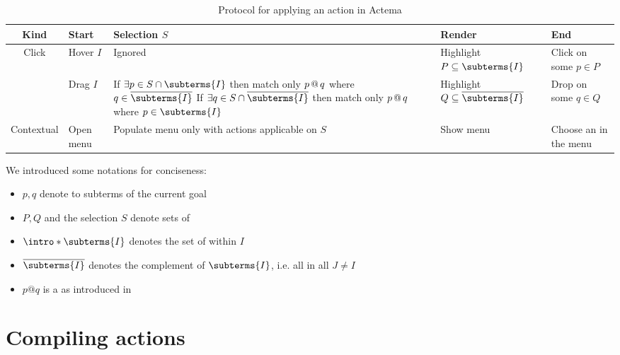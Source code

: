 \begin{table*}[]
  \def\arraystretch{1.5}
  \begin{tabular}{|c|C{0.2\textwidth}|C{0.4\textwidth}|C{0.25\textwidth}|C{0.2\textwidth}|}
  \hline
  \textbf{Kind} & \textbf{Start}       & \textbf{Selection $S$} &
  \textbf{Render}                      & \textbf{End} \\ \hline
  Click         & Hover  $I$       & Ignored & Highlight $P \subseteq
  \subterms{I}$ & Click on some $p \in P$    \\ \hline
             & Drag  $I$        &
      If $\exists p \in S \cap \subterms{I}$ then match only $p \operatorname{\mathrel{@}} q$ where
      $q \in \substermscompl{\subterms{I}}$
      \newline
      If $\exists q \in S \cap \substermscompl{\subterms{I}}$ then match only $p
      \operatorname{\mathrel{@}} q$ where $p \in \subterms{I}$
    & Highlight $Q \subseteq \substermscompl{\subterms{I}}$ & Drop on some $q \in Q$ \\ \hline
  Contextual    & Open menu & Populate menu only with actions
  applicable on $S$ & Show menu & Choose an  in the menu \\ \hline
  \end{tabular}
  \raggedright
  \parbox{\textwidth}{
    \vspace{1.5em}
    We introduced some notations for conciseness:
    \begin{itemize}
      \item $p, q$ denote  to subterms of the current goal
      \item $P, Q$ and the selection $S$ denote sets of 
      \item $\intro*\subterms{I}$ denotes the set of  within  $I$
      \item $\substermscompl{\subterms{I}}$ denotes the complement of $\subterms{I}$, i.e.
      all  in all  $J \not= I$
      \item $p @ q$ is a  as introduced in 
    \end{itemize}}

  \caption{Protocol for applying an action in Actema}
\end{table*}


\section{Compiling actions}

